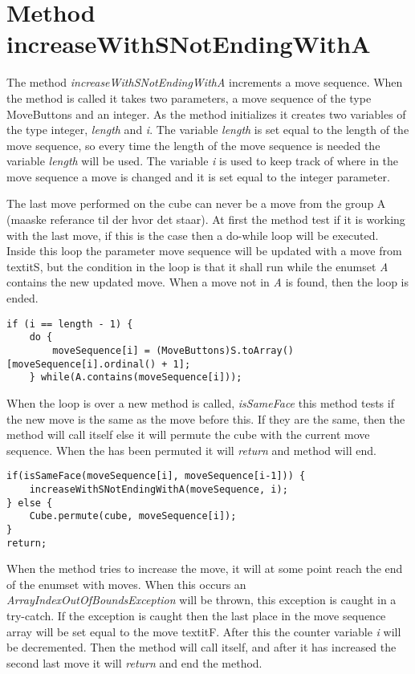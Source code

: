 \section{Method increaseWithSNotEndingWithA}
\label{sec:increaseWithSNotEndingWithA}
The method \textit{increaseWithSNotEndingWithA} increments a move sequence.
When the method is called it takes two parameters, a move sequence of the type MoveButtons and an integer.
As the method initializes it creates two variables of the type integer, \textit{length} and \textit{i}.
The variable \textit{length} is set equal to the length of the move sequence, so every time the length of the move sequence is needed the variable \textit{length} will be used.
The variable \textit{i} is used to keep track of where in the move sequence a move is changed and it is set equal to the integer parameter. 

The last move performed on the cube can never be a move from the group A (maaske referance til der hvor det staar).
At first the method test if it is working with the last move, if this is the case then a do-while loop will be executed.
Inside this loop the parameter move sequence will be updated with a move from textit{S}, but the condition in the loop is that it shall run while the enumset \textit{A} contains the new updated move.
When a move not in \textit{A} is found, then the loop is ended.

\begin{verbatim}
if (i == length - 1) {
	do {
		moveSequence[i] = (MoveButtons)S.toArray()[moveSequence[i].ordinal() + 1];
	} while(A.contains(moveSequence[i]));
\end{verbatim}

When the loop is over a new method is called, \textit{isSameFace} this method tests if the new move is the same as the move before this.
If they are the same, then the method will call itself else it will permute the cube with the current move sequence.
When the \rubik{} has been permuted it will \textit{return} and method will end.

\begin{verbatim}
if(isSameFace(moveSequence[i], moveSequence[i-1])) {
	increaseWithSNotEndingWithA(moveSequence, i);
} else {
	Cube.permute(cube, moveSequence[i]);
}
return;
\end{verbatim}

When the method tries to increase the move, it will at some point reach the end of the enumset with moves.
When this occurs an \textit{ArrayIndexOutOfBoundsException} will be thrown, this exception is caught in a try-catch.
If the exception is caught then the last place in the move sequence array will be set equal to the move textit{F}.
After this the counter variable \textit{i} will be decremented.
Then the method will call itself, and after it has increased the second last move it will \textit{return} and end the method.

